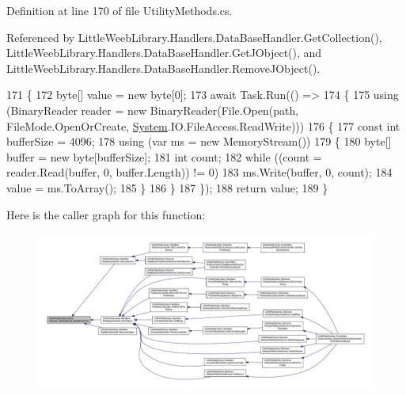 Definition at line 170 of file Utility\+Methods.\+cs.



Referenced by Little\+Weeb\+Library.\+Handlers.\+Data\+Base\+Handler.\+Get\+Collection(), Little\+Weeb\+Library.\+Handlers.\+Data\+Base\+Handler.\+Get\+J\+Object(), and Little\+Weeb\+Library.\+Handlers.\+Data\+Base\+Handler.\+Remove\+J\+Object().


\begin{DoxyCode}
171         \{
172             byte[] value = \textcolor{keyword}{new} byte[0];
173             await Task.Run(() =>
174             \{
175                 \textcolor{keyword}{using} (BinaryReader reader = \textcolor{keyword}{new} BinaryReader(File.Open(path, FileMode.OpenOrCreate, 
      \mbox{\hyperlink{namespace_system}{System}}.IO.FileAccess.ReadWrite)))
176                 \{
177                     \textcolor{keyword}{const} \textcolor{keywordtype}{int} bufferSize = 4096;
178                     \textcolor{keyword}{using} (var ms = \textcolor{keyword}{new} MemoryStream())
179                     \{
180                         byte[] buffer = \textcolor{keyword}{new} byte[bufferSize];
181                         \textcolor{keywordtype}{int} count;
182                         \textcolor{keywordflow}{while} ((count = reader.Read(buffer, 0, buffer.Length)) != 0)
183                             ms.Write(buffer, 0, count);
184                         value = ms.ToArray();
185                     \}
186                 \}
187             \});
188             \textcolor{keywordflow}{return} value;
189         \}
\end{DoxyCode}
Here is the caller graph for this function\+:\nopagebreak
\begin{figure}[H]
\begin{center}
\leavevmode
\includegraphics[width=350pt]{class_little_weeb_library_1_1_static_classes_1_1_utility_methods_a7b5de7a3ecc749b655fc3ed2af55360b_icgraph}
\end{center}
\end{figure}
\mbox{\label{class_little_weeb_library_1_1_static_classes_1_1_utility_methods_afc8c716f32bc35d59afdb287be06c3ca}} 
